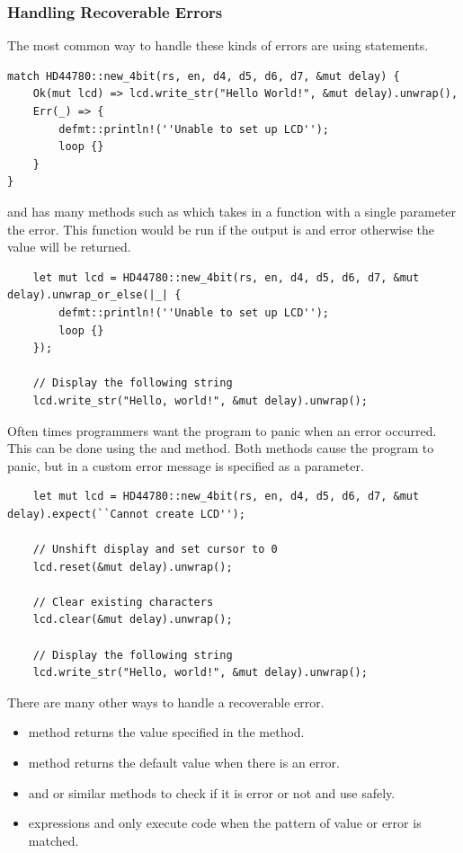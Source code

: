 \documentclass{beamer}
\begin{document}
\begin{frame}
  \frametitle[]{Handling Recoverable Errors}
  The most common way to handle these kinds of errors are using  statements.

\begin{lstlisting}
match HD44780::new_4bit(rs, en, d4, d5, d6, d7, &mut delay) {
    Ok(mut lcd) => lcd.write_str("Hello World!", &mut delay).unwrap(),
    Err(_) => {
        defmt::println!(''Unable to set up LCD'');
        loop {}
    }
}
\end{lstlisting}

\pagebreak

 and  has many methods such as  which takes in a function with a single parameter the error. This function would be run if the output is and error otherwise the value  will be returned.

\begin{lstlisting}
    let mut lcd = HD44780::new_4bit(rs, en, d4, d5, d6, d7, &mut delay).unwrap_or_else(|_| {
        defmt::println!(''Unable to set up LCD'');
        loop {}
    });

    // Display the following string
    lcd.write_str("Hello, world!", &mut delay).unwrap();
\end{lstlisting}

\pagebreak

Often times programmers want the program to panic when an error occurred. This can be done using the  and  method. Both methods cause the program to panic, but in  a custom error message is specified as a parameter.

\begin{lstlisting}
    let mut lcd = HD44780::new_4bit(rs, en, d4, d5, d6, d7, &mut delay).expect(``Cannot create LCD'');

    // Unshift display and set cursor to 0
    lcd.reset(&mut delay).unwrap();

    // Clear existing characters
    lcd.clear(&mut delay).unwrap();

    // Display the following string
    lcd.write_str("Hello, world!", &mut delay).unwrap();
\end{lstlisting}

\pagebreak

There are many other ways to handle a recoverable error.
\begin{itemize}
  \item{ method returns the value specified in the method.}
  \item{ method returns the default value when there is an error.}
  \item{ and  or similar methods to check if it is error or not and use  safely.}
  \item{ expressions and only execute code when the pattern of value or error is matched.}
\end{itemize}
\end{frame}
\end{document}
